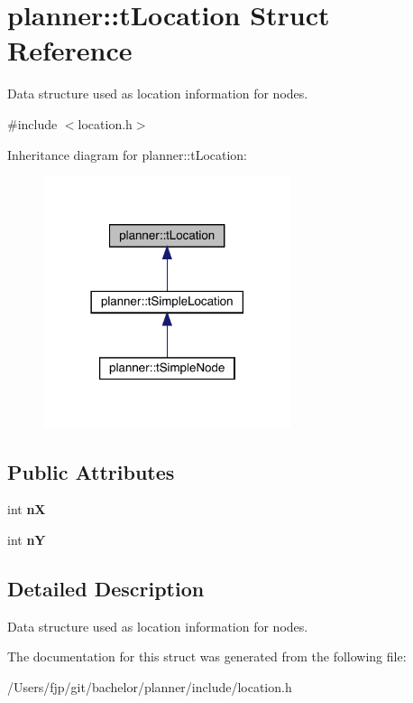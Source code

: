 \hypertarget{structplanner_1_1t_location}{}\section{planner\+:\+:t\+Location Struct Reference}
\label{structplanner_1_1t_location}


Data structure used as location information for nodes.  




{\ttfamily \#include $<$location.\+h$>$}



Inheritance diagram for planner\+:\+:t\+Location\+:
\nopagebreak
\begin{figure}[H]
\begin{center}
\leavevmode
\includegraphics[width=206pt]{structplanner_1_1t_location__inherit__graph}
\end{center}
\end{figure}
\subsection*{Public Attributes}
\begin{DoxyCompactItemize}
\item 
\mbox{\label{structplanner_1_1t_location_aca6603f36eb5d71b738ec085080d4f76}} 
int {\bfseries nX}
\item 
\mbox{\label{structplanner_1_1t_location_a83bc1d843b7603e1fc9913001b41421a}} 
int {\bfseries nY}
\end{DoxyCompactItemize}


\subsection{Detailed Description}
Data structure used as location information for nodes. 

The documentation for this struct was generated from the following file\+:\begin{DoxyCompactItemize}
\item 
/\+Users/fjp/git/bachelor/planner/include/location.\+h\end{DoxyCompactItemize}
